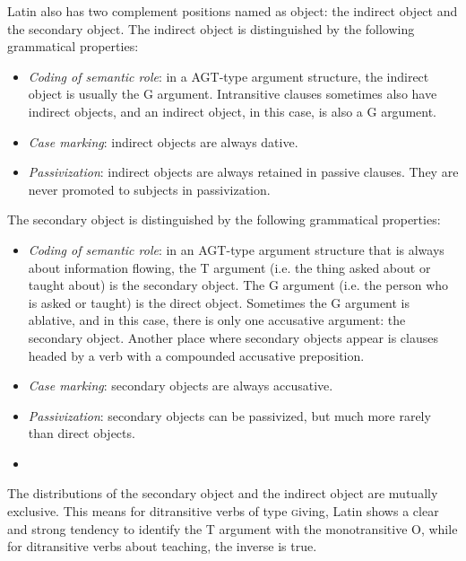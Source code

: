 \documentclass[UTF8, a4paper, oneside]{report}
\newcommand{\classify}[1]{{\textsc #1}}
\begin{document}
Latin also has two complement positions named as object:
the indirect object and the secondary object.
The indirect object is distinguished by the following grammatical properties:
\begin{itemize}
    \item \emph{Coding of semantic role}: in a AGT-type argument structure, 
    the indirect object is usually the G argument.
    Intransitive clauses sometimes also have indirect objects, 
    and an indirect object, in this case, is also a G argument.
    \item \emph{Case marking}: indirect objects are always dative.
    \item \emph{Passivization}: indirect objects are always retained in passive clauses. 
    They are never promoted to subjects in passivization.
\end{itemize}

The secondary object is distinguished by the following grammatical properties:
\begin{itemize}
    \item \emph{Coding of semantic role}: in an AGT-type argument structure
    that is always about information flowing,
    the T argument (i.e. the thing asked about or taught about) is the secondary object.
    The G argument (i.e. the person who is asked or taught) is the direct object.
    Sometimes the G argument is ablative, and in this case, 
    there is only one accusative argument: the secondary object.
    Another place where secondary objects appear is 
    clauses headed by a verb with a compounded accusative preposition. %
    \item \emph{Case marking}: secondary objects are always accusative.
    \item \emph{Passivization}: secondary objects can be passivized, but much more rarely than direct objects.
    \item %
\end{itemize}

The distributions of the secondary object and the indirect object 
are mutually exclusive.
This means for ditransitive verbs of type \classify{giving}, 
Latin shows a clear and strong tendency to identify the T argument with the monotransitive O,
while for ditransitive verbs about teaching,
the inverse is true.
\end{document}
